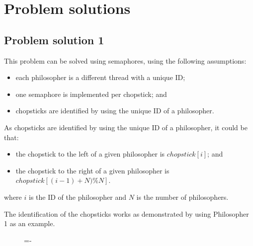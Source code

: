 \documentclass[a4paper]{systems-software}
\begin{document}
\section*{Problem solutions}

\subsection*{Problem solution 1}

This problem can be solved using semaphores, using the following assumptions:
\begin{itemize}
	\item each philosopher is a different thread with a unique ID;
	\item one semaphore is implemented per chopstick; and
	\item chopsticks are identified by using the unique ID of a philosopher.
\end{itemize}

As chopsticks are identified by using the unique ID of a philosopher, it could be that:
\begin{itemize}
	\item the chopstick to the left of a given philosopher is $chopstick[i]$; and
	\item the chopstick to the right of a given philosopher is $chopstick[(i-1) + N) \% N].$
\end{itemize}
where $i$ is the ID of the philosopher and $N$ is the number of philosophers.

The identification of the chopsticks works as demonstrated by using Philosopher 1 as an example.

\begin{figure}[H]
  \lineskip=-\fboxrule
\end{figure}
\end{document}
